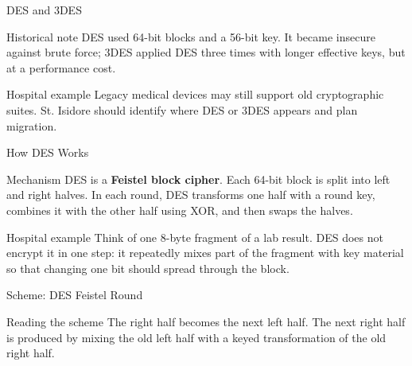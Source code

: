 \documentclass[presentation]{beamer}
\begin{document}
\begin{frame}[c]{DES and 3DES}
\begin{block}{Historical note}
DES used 64-bit blocks and a 56-bit key. It became insecure against brute force; 3DES applied DES
three times with longer effective keys, but at a performance cost.
\end{block}

\begin{exampleblock}{Hospital example}
Legacy medical devices may still support old cryptographic suites. St. Isidore should identify
where DES or 3DES appears and plan migration.
\end{exampleblock}
\end{frame}

\begin{frame}[c]{How DES Works}
\begin{block}{Mechanism}
DES is a \textbf{Feistel block cipher}. Each 64-bit block is split into left and right halves. In
each round, DES transforms one half with a round key, combines it with the other half using XOR, and
then swaps the halves.
\end{block}

\begin{exampleblock}{Hospital example}
Think of one 8-byte fragment of a lab result. DES does not encrypt it in one step: it repeatedly
mixes part of the fragment with key material so that changing one bit should spread through the
block.
\end{exampleblock}
\end{frame}

\begin{frame}[c]{Scheme: DES Feistel Round}
\begin{center}
\end{center}

\begin{block}{Reading the scheme}
The right half becomes the next left half. The next right half is produced by mixing the old left
half with a keyed transformation of the old right half.
\end{block}
\end{frame}
\end{document}
